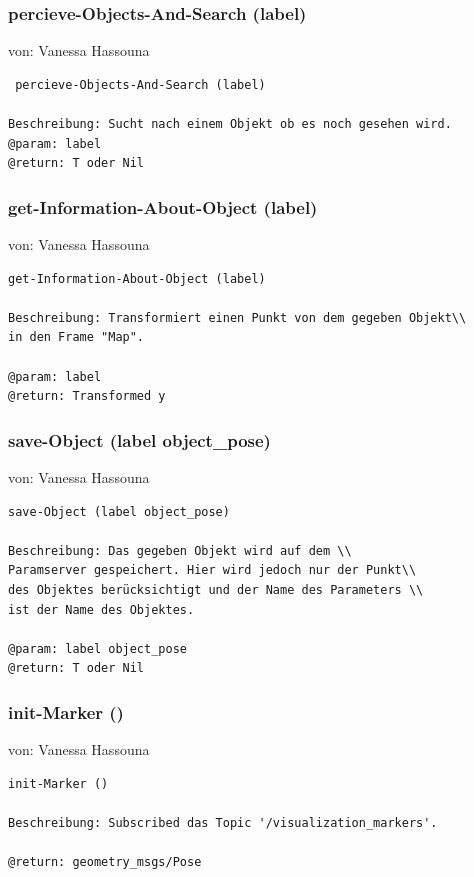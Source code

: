 \documentclass{suturo}
\makeatletter
\newcommand{\chapterauthor}[1]{%
  {\parindent0pt\vspace*{-27pt}%
  \linespread{0}\small\begin{flushright}von: #1\end{flushright}%
  \par\nobreak\vspace*{0pt}}
  \@afterheading%
}
\makeatother
\begin{document}
\subsubsection{ percieve-Objects-And-Search (label)}
\chapterauthor{Vanessa Hassouna}
\begin{verbatim}
 percieve-Objects-And-Search (label)

Beschreibung: Sucht nach einem Objekt ob es noch gesehen wird.
@param: label
@return: T oder Nil
\end{verbatim}


\subsubsection{get-Information-About-Object (label)}
\chapterauthor{Vanessa Hassouna}
\begin{verbatim}
get-Information-About-Object (label)

Beschreibung: Transformiert einen Punkt von dem gegeben Objekt\\
in den Frame "Map".

@param: label
@return: Transformed y
\end{verbatim}

\subsubsection{save-Object (label object\_pose)}
\chapterauthor{Vanessa Hassouna}
\begin{verbatim}
save-Object (label object_pose)

Beschreibung: Das gegeben Objekt wird auf dem \\
Paramserver gespeichert. Hier wird jedoch nur der Punkt\\
des Objektes berücksichtigt und der Name des Parameters \\
ist der Name des Objektes.

@param: label object_pose
@return: T oder Nil
\end{verbatim}


\subsubsection{init-Marker ()}
\chapterauthor{Vanessa Hassouna}
\begin{verbatim}
init-Marker ()

Beschreibung: Subscribed das Topic '/visualization_markers'.

@return: geometry_msgs/Pose
\end{verbatim}
\end{document}
